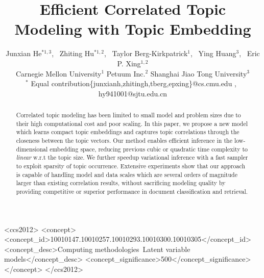 \documentclass[sigconf]{acmart}
\begin{document}
\title{Efficient Correlated Topic Modeling with Topic Embedding}

\author{
Junxian He$^{*1,3}$,~ Zhiting Hu$^{*1,2}$,~ Taylor Berg-Kirkpatrick$^1$,~ Ying Huang$^{3}$,~ Eric P. Xing$^{1,2}$ \\
{\large 
Carnegie Mellon University$^{1}$ 
\quad Petuum Inc.$^2$ 
\quad Shanghai Jiao Tong University$^3$
}\\
{\large $^{*}$ Equal contribution\quad \{junxianh,zhitingh,tberg,epxing\}@cs.cmu.edu
,~ hy941001@sjtu.edu.cn}
}


\begin{abstract}
Correlated topic modeling has been limited to small model and problem sizes due to their high computational cost and poor scaling. In this paper, we propose a new model which learns compact topic embeddings and captures topic correlations through the closeness between the topic vectors. Our method enables efficient inference in the low-dimensional embedding space, reducing previous cubic or quadratic time complexity to {\it linear} w.r.t the topic size. We further speedup variational inference with a fast sampler to exploit sparsity of topic occurrence. Extensive experiments show that our approach is capable of handling model and data scales which are several orders of magnitude larger than existing correlation results, without sacrificing modeling quality by providing competitive or superior performance in document classification and retrieval.
\end{abstract}

\begin{CCSXML}
<ccs2012>
<concept>
<concept_id>10010147.10010257.10010293.10010300.10010305</concept_id>
<concept_desc>Computing methodologies~Latent variable models</concept_desc>
<concept_significance>500</concept_significance>
</concept>
</ccs2012>
\end{CCSXML}



\maketitle
\end{document}
